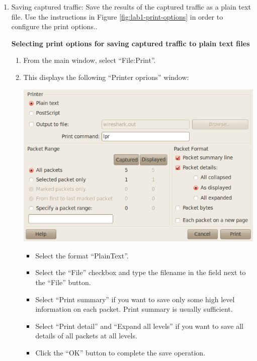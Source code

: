 \begin{enumerate}
	\item Saving captured traffic: Save the results of the captured traffic as a plain text file. Use the instructions in Figure \ref{fig:lab1-print-options} in order to configure the print options..\par
		\begin{minipage}{\linewidth}
			\begin{framed}
				\centering
				\textbf{Selecting print options for saving captured traffic to plain text files}
				\begin{enumerate}
					\item From the main window, select ``File:Print''.
					\item This displays the following ``Printer oprions'' window:\par
					\includegraphics[width=\linewidth]{graphics/wireshark-print-updated.png}
					\begin{itemize}
						\item Select the format ``PlainText''.
						\item Select the ``File'' checkbox and type the filename in the field next to the ``File'' button.
						\item Select ``Print summary'' if you want to save only some high level information on each packet. Print summary is usually sufficient.
						\item Select ``Print detail'' and ``Expand all levels'' if you want to save all details of all packets at all levels.
						\item Click the ``OK'' button to complete the save operation.
					\end{itemize}
				\end{enumerate}
			\end{framed}

\end{minipage}
\end{enumerate}
